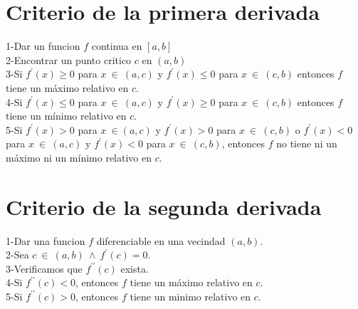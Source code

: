 \documentclass[10pt,a4paper]{article}
\begin{document}
\LARGE
\section{Criterio de la primera derivada}

1-Dar un funcion $f$ continua en $ \left[ a,b \right] $ \\
2-Encontrar un punto critico $c$ en $ \left( a,b \right)  $ \\
3-Si $ f^{\prime} \left( x \right) \geq 0   $ para $x \ \in \ \left( a,c \right)  $ y $ f ^{\prime} \left( x \right) \leq 0  $
para $ x \ \in \ \left( c,b \right)  $ entonces $f$ tiene un máximo relativo en $c$. \\
4-Si $ f^{\prime} \left( x \right) \leq 0   $ para $x \ \in \ \left( a,c \right)  $ y $ f ^{\prime} \left( x \right) \geq 0  $
para $ x \ \in \ \left( c,b \right)  $ entonces $f$ tiene un mínimo relativo en $c$. \\
5-Si $f^ {\prime} \left( x \right) > 0 $ para $x \ \in \left( a,c \right)  $ y $ f^{\prime} \left( x \right) >0   $ para 
$x \ \in \ \left( c,b \right)  $ o $ f^{\prime} \left( x \right) <0  $ para $x \ \in \ \left( a,c \right)  $ y 
$ f^{\prime} \left( x \right) <0 $ para $ x \ \in \ \left( c,b \right)  $, entonces $f$ no tiene ni un máximo ni un mínimo 
relativo en $c$.

\section{Criterio de la segunda derivada}
1-Dar una funcion $f$ diferenciable en una vecindad $ \left( a,b \right)  $. \\
2-Sea $c \ \in \ \left( a,b \right) \ \wedge \ f^{\prime} \left( c \right) =0 $.  \\
3-Verificamos que $f^{\prime \prime} \left( c \right) $ exista.\\
4-Si $f^{\prime \prime} \left( c \right)  < 0$, entonces $f$ tiene un máximo relativo en $c$.\\
5-Si $f^{\prime \prime} \left( c \right)   > 0$, entonces $f$ tiene un minimo relativo en $c$.\\
\end{document}
